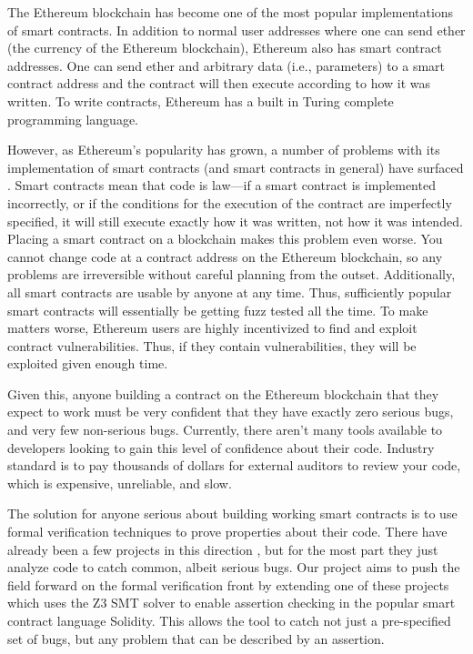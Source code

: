 \documentclass[acmsmall]{acmart}\settopmatter{}
\begin{document}
The Ethereum blockchain \cite{ethereumwhite} \cite{ethereumyellow} has become one of the most popular implementations of smart contracts. In addition to normal user addresses where one can send ether (the currency of the Ethereum blockchain), Ethereum also has smart contract addresses. One can send ether and arbitrary data (i.e., parameters) to a smart contract address and the contract will then execute according to how it was written. To write contracts, Ethereum has a built in Turing complete programming language.

However, as Ethereum's popularity has grown, a number of problems with its implementation of smart contracts (and smart contracts in general) have surfaced \cite{soliditybugs}. Smart contracts mean that code is law---if a smart contract is implemented incorrectly, or if the conditions for the execution of the contract are imperfectly specified, it will still execute exactly how it was written, not how it was intended. Placing a smart contract on a blockchain makes this problem even worse. You cannot change code at a contract address on the Ethereum blockchain, so any problems are irreversible without careful planning from the outset. Additionally, all smart contracts are usable by anyone at any time. Thus, sufficiently popular smart contracts will essentially be getting fuzz tested all the time. To make matters worse, Ethereum users are highly incentivized to find and exploit contract vulnerabilities. Thus, if they contain vulnerabilities, they will be exploited given enough time.

Given this, anyone building a contract on the Ethereum blockchain that they expect to work must be very confident that they have exactly zero serious bugs, and very few non-serious bugs. Currently, there aren't many tools available to developers looking to gain this level of confidence about their code. Industry standard is to pay thousands of dollars for external auditors to review your code, which is expensive, unreliable, and slow.

The solution for anyone serious about building working smart contracts is to use formal verification techniques to prove properties about their code. There have already been a few projects in this direction \cite{verif1} \cite{fstar} \cite{oyente} \cite{mythril}, but for the most part they just analyze code to catch common, albeit serious bugs. Our project aims to push the field forward on the formal verification front by extending one of these projects which uses the Z3 SMT solver \cite{z3} to enable assertion checking in the popular smart contract language Solidity. This allows the tool to catch not just a pre-specified set of bugs, but any problem that can be described by an assertion. 
\end{document}
